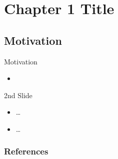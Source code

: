 
\section{Chapter 1 Title}

\subsection{Motivation}
\begin{frame}{Motivation}
	\begin{itemize}
		\item \cite{Abbring2007}
	\end{itemize}
\end{frame}

\begin{frame}{2nd Slide}
	\begin{itemize}
		\item \ldots \pause
		\item \ldots \pause
	\end{itemize}
\end{frame}

\begin{frame}\frametitle{References}
	\printbibliography
\end{frame}
 